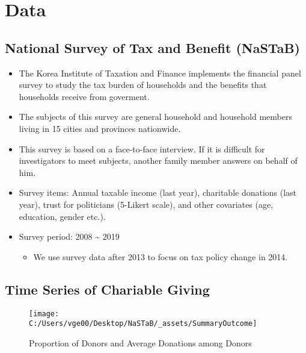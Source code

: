 \documentclass[ review  , 3p ]{elsarticle}
\providecommand{\tightlist}{%
  \setlength{\itemsep}{0pt}\setlength{\parskip}{0pt}}
\begin{document}
  \hypertarget{data}{%
  \section{Data}\label{data}}
  
  \hypertarget{national-survey-of-tax-and-benefit-nastab}{%
  \subsection{National Survey of Tax and Benefit (NaSTaB)}\label{national-survey-of-tax-and-benefit-nastab}}
  
  \begin{itemize}
  \tightlist
  \item
    The Korea Institute of Taxation and Finance implements the financial panel survey to study the tax burden of households and the benefits that households receive from goverment.
  \item
    The subjects of this survey are general household and household members living in 15 cities and provinces nationwide.
  \item
    This survey is based on a face-to-face interview. If it is difficult for investigators to meet subjects, another family member answers on behalf of him.
  \item
    Survey items: Annual taxable income (last year), charitable donations (last year), trust for politicians (5-Likert scale), and other covariates (age, education, gender etc.).
  \item
    Survey period: 2008 \textasciitilde{} 2019
  
    \begin{itemize}
    \tightlist
    \item
      We use survey data after 2013 to focus on tax policy change in 2014.
    \end{itemize}
  \end{itemize}
  
  \hypertarget{time-series-of-chariable-giving}{%
  \subsection{Time Series of Chariable Giving}\label{time-series-of-chariable-giving}}
  
  \begin{figure}
  
  {\centering \texttt{[image: C:/Users/vge00/Desktop/NaSTaB/\_assets/SummaryOutcome]} 
  
  }
  
  \caption{Proportion of Donors and Average Donations among Donors}\label{fig:unnamed-chunk-1}
  \end{figure}
  
\end{document}
